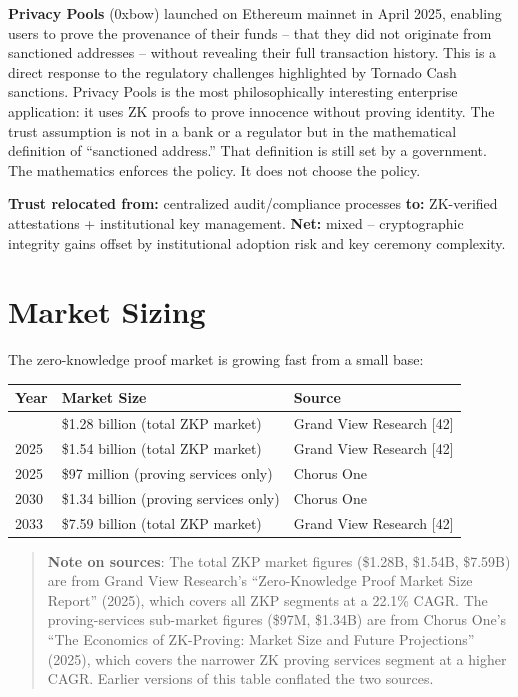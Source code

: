\documentclass[
  11pt,
  openany]{report}
\renewcommand{\textbf}[1]{{\bfseries\color{MidnightBold}#1}}
\begin{document}
\textbf{Privacy Pools} (0xbow) launched on Ethereum mainnet in April 2025,
enabling users to prove the provenance of their funds -- that they did not
originate from sanctioned addresses -- without revealing their full transaction
history. This is a direct response to the regulatory challenges highlighted by
Tornado Cash sanctions. Privacy Pools is the most philosophically interesting
enterprise application: it uses ZK proofs to prove innocence without proving
identity. The trust assumption is not in a bank or a regulator but in the
mathematical definition of ``sanctioned address.'' That definition is still set
by a government. The mathematics enforces the policy. It does not choose the
policy.

\textbf{Trust relocated from:} centralized audit/compliance processes
\textbf{to:} ZK-verified attestations + institutional key management.
\textbf{Net:} mixed -- cryptographic integrity gains offset by institutional
adoption risk and key ceremony complexity.

\section{Market Sizing}\label{market-sizing}

The zero-knowledge proof market is growing fast from a small base:

\begin{longtable}[]{@{}lll@{}}
\toprule\noalign{}
Year & Market Size & Source \\
\midrule\noalign{}
\arrayrulecolor{MidnightBlue}\midrule\arrayrulecolor{MidnightBorder}
\endhead
\bottomrule\noalign{}
\endlastfoot
2024 & \$1.28 billion (total ZKP market) & Grand View Research {[}42{]} \\
2025 & \$1.54 billion (total ZKP market) & Grand View Research {[}42{]} \\
2025 & \$97 million (proving services only) & Chorus One \\
2030 & \$1.34 billion (proving services only) & Chorus One \\
2033 & \$7.59 billion (total ZKP market) & Grand View Research {[}42{]} \\
\end{longtable}

\begin{quote}
\textbf{Note on sources}: The total ZKP market figures (\$1.28B, \$1.54B,
\$7.59B) are from Grand View Research's ``Zero-Knowledge Proof Market Size
Report'' (2025), which covers all ZKP segments at a 22.1\% CAGR. The
proving-services sub-market figures (\$97M, \$1.34B) are from Chorus One's ``The
Economics of ZK-Proving: Market Size and Future Projections'' (2025), which
covers the narrower ZK proving services segment at a higher CAGR. Earlier
versions of this table conflated the two sources.
\end{quote}
\end{document}

